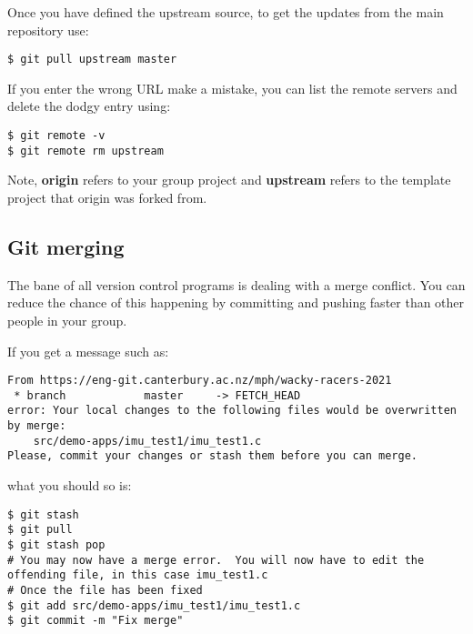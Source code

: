 Once you have defined the upstream source, to get the updates from the
main repository use:
%
\begin{verbatim}
$ git pull upstream master
\end{verbatim}

If you enter the wrong URL make a mistake, you can list the remote
servers and delete the dodgy entry using:

\begin{verbatim}
$ git remote -v
$ git remote rm upstream
\end{verbatim}

Note, \textbf{origin} refers to your group project and \textbf{upstream}
refers to the template project that origin was forked from.


\subsection{Git merging}
\label{git-merging}

The bane of all version control programs is dealing with a merge
conflict. You can reduce the chance of this happening by committing and
pushing faster than other people in your group.

If you get a message such as:

\begin{verbatim}
From https://eng-git.canterbury.ac.nz/mph/wacky-racers-2021
 * branch            master     -> FETCH_HEAD
error: Your local changes to the following files would be overwritten by merge:
    src/demo-apps/imu_test1/imu_test1.c
Please, commit your changes or stash them before you can merge.
\end{verbatim}

what you should so is:

\begin{verbatim}
$ git stash
$ git pull
$ git stash pop
# You may now have a merge error.  You will now have to edit the offending file, in this case imu_test1.c
# Once the file has been fixed
$ git add src/demo-apps/imu_test1/imu_test1.c
$ git commit -m "Fix merge"
\end{verbatim}

